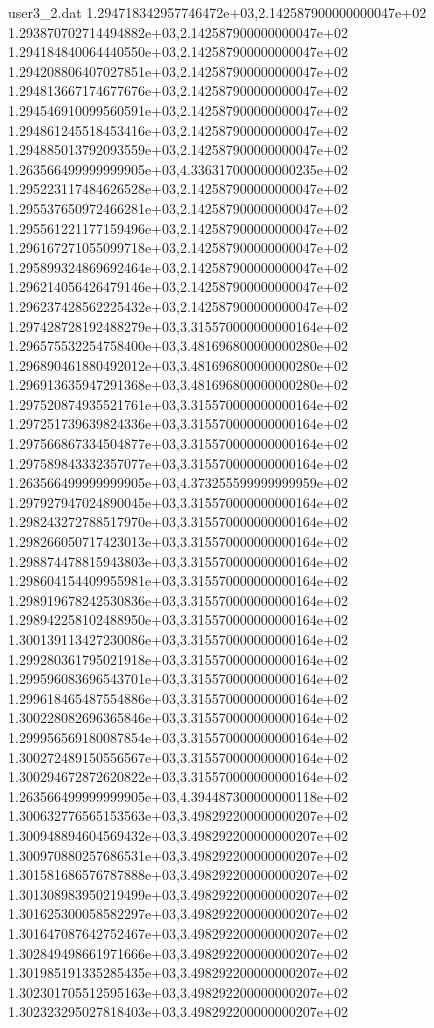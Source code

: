 \begin{filecontents}{user3_2.dat}
1.294718342957746472e+03,2.142587900000000047e+02
1.293870702714494882e+03,2.142587900000000047e+02
1.294184840064440550e+03,2.142587900000000047e+02
1.294208806407027851e+03,2.142587900000000047e+02
1.294813667174677676e+03,2.142587900000000047e+02
1.294546910099560591e+03,2.142587900000000047e+02
1.294861245518453416e+03,2.142587900000000047e+02
1.294885013792093559e+03,2.142587900000000047e+02
1.263566499999999905e+03,4.336317000000000235e+02
1.295223117484626528e+03,2.142587900000000047e+02
1.295537650972466281e+03,2.142587900000000047e+02
1.295561221177159496e+03,2.142587900000000047e+02
1.296167271055099718e+03,2.142587900000000047e+02
1.295899324869692464e+03,2.142587900000000047e+02
1.296214056426479146e+03,2.142587900000000047e+02
1.296237428562225432e+03,2.142587900000000047e+02
1.297428728192488279e+03,3.315570000000000164e+02
1.296575532254758400e+03,3.481696800000000280e+02
1.296890461880492012e+03,3.481696800000000280e+02
1.296913635947291368e+03,3.481696800000000280e+02
1.297520874935521761e+03,3.315570000000000164e+02
1.297251739639824336e+03,3.315570000000000164e+02
1.297566867334504877e+03,3.315570000000000164e+02
1.297589843332357077e+03,3.315570000000000164e+02
1.263566499999999905e+03,4.373255599999999959e+02
1.297927947024890045e+03,3.315570000000000164e+02
1.298243272788517970e+03,3.315570000000000164e+02
1.298266050717423013e+03,3.315570000000000164e+02
1.298874478815943803e+03,3.315570000000000164e+02
1.298604154409955981e+03,3.315570000000000164e+02
1.298919678242530836e+03,3.315570000000000164e+02
1.298942258102488950e+03,3.315570000000000164e+02
1.300139113427230086e+03,3.315570000000000164e+02
1.299280361795021918e+03,3.315570000000000164e+02
1.299596083696543701e+03,3.315570000000000164e+02
1.299618465487554886e+03,3.315570000000000164e+02
1.300228082696365846e+03,3.315570000000000164e+02
1.299956569180087854e+03,3.315570000000000164e+02
1.300272489150556567e+03,3.315570000000000164e+02
1.300294672872620822e+03,3.315570000000000164e+02
1.263566499999999905e+03,4.394487300000000118e+02
1.300632776565153563e+03,3.498292200000000207e+02
1.300948894604569432e+03,3.498292200000000207e+02
1.300970880257686531e+03,3.498292200000000207e+02
1.301581686576787888e+03,3.498292200000000207e+02
1.301308983950219499e+03,3.498292200000000207e+02
1.301625300058582297e+03,3.498292200000000207e+02
1.301647087642752467e+03,3.498292200000000207e+02
1.302849498661971666e+03,3.498292200000000207e+02
1.301985191335285435e+03,3.498292200000000207e+02
1.302301705512595163e+03,3.498292200000000207e+02
1.302323295027818403e+03,3.498292200000000207e+02

\end{filecontents}
